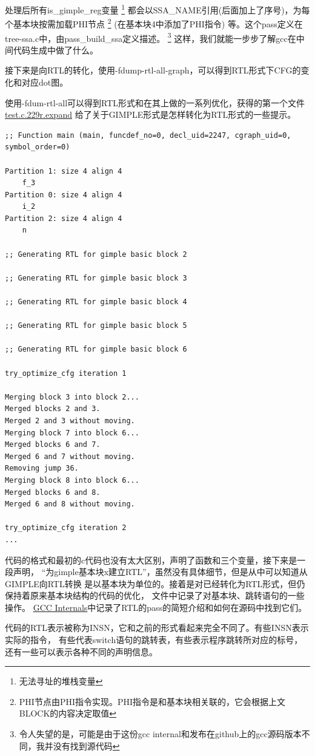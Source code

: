 \documentclass[UTF8,a4paper,10pt]{ctexart}
\begin{document}
处理后所有is\_gimple\_reg变量
\footnote{无法寻址的堆栈变量}
都会以SSA\_NAME引用(后面加上了序号)，为每个基本块按需加载PHI节点
\footnote{PHI节点由PHI指令实现。PHI指令是和基本块相关联的，它会根据上文BLOCK的内容决定取值}
(在基本块4中添加了PHI指令)
等。这个pass定义在tree-ssa.c中，由pass\_build\_ssa定义描述。
\footnote{令人失望的是，可能是由于这份gcc internal和发布在github上的gcc源码版本不同，我并没有找到源代码}
这样，我们就能一步步了解gcc在中间代码生成中做了什么。
\par
接下来是向RTL的转化，使用-fdump-rtl-all-graph，可以得到RTL形式下CFG的变化和对应dot图。
\par
使用-fdum-rtl-all可以得到RTL形式和在其上做的一系列优化，获得的第一个文件
\href{run:./test/rtl/test.c.229r.expand}{test.c.229r.expand}
给了关于GIMPLE形式是怎样转化为RTL形式的一些提示。
\begin{lstlisting}
;; Function main (main, funcdef_no=0, decl_uid=2247, cgraph_uid=0, symbol_order=0)

Partition 1: size 4 align 4
	f_3
Partition 0: size 4 align 4
	i_2
Partition 2: size 4 align 4
	n

;; Generating RTL for gimple basic block 2

;; Generating RTL for gimple basic block 3

;; Generating RTL for gimple basic block 4

;; Generating RTL for gimple basic block 5

;; Generating RTL for gimple basic block 6

try_optimize_cfg iteration 1

Merging block 3 into block 2...
Merged blocks 2 and 3.
Merged 2 and 3 without moving.
Merging block 7 into block 6...
Merged blocks 6 and 7.
Merged 6 and 7 without moving.
Removing jump 36.
Merging block 8 into block 6...
Merged blocks 6 and 8.
Merged 6 and 8 without moving.

try_optimize_cfg iteration 2
...
\end{lstlisting}
代码的格式和最初的c代码也没有太大区别，声明了函数和三个变量，接下来是一段声明，
“为gimple基本块x建立RTL”，虽然没有具体细节，但是从中可以知道从GIMPLE向RTL转换
是以基本块为单位的。接着是对已经转化为RTL形式，但仍保持着原来基本块结构的代码的优化，
文件中记录了对基本块、跳转语句的一些操作。
\href{run:./gccint.pdf}{GCC Internals}中记录了RTL的pass的简短介绍和如何在源码中找到它们。
\par
代码的RTL表示被称为INSN，它和之前的形式看起来完全不同了。有些INSN表示实际的指令，
有些代表switch语句的跳转表，有些表示程序跳转所对应的标号，还有一些可以表示各种不同的声明信息。
\end{document}
